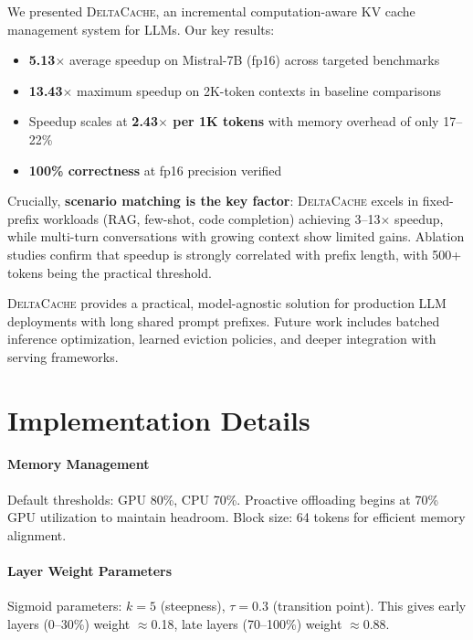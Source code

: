 \documentclass{article}
\newcommand{\deltacache}{\textsc{DeltaCache}}
\begin{document}
We presented \deltacache{}, an incremental computation-aware KV cache management system for LLMs.
Our key results:
\begin{itemize}
    \item \textbf{5.13$\times$} average speedup on Mistral-7B (fp16) across targeted benchmarks
    \item \textbf{13.43$\times$} maximum speedup on 2K-token contexts in baseline comparisons
    \item Speedup scales at \textbf{2.43$\times$ per 1K tokens} with memory overhead of only 17--22\%
    \item \textbf{100\% correctness} at fp16 precision verified
\end{itemize}

Crucially, \textbf{scenario matching is the key factor}: \deltacache{} excels in fixed-prefix workloads (RAG, few-shot, code completion) achieving 3--13$\times$ speedup, while multi-turn conversations with growing context show limited gains.
Ablation studies confirm that speedup is strongly correlated with prefix length, with 500+ tokens being the practical threshold.

\deltacache{} provides a practical, model-agnostic solution for production LLM deployments with long shared prompt prefixes.
Future work includes batched inference optimization, learned eviction policies, and deeper integration with serving frameworks.




\newpage
\appendix

\section{Implementation Details}
\label{app:impl}

\paragraph{Memory Management}
Default thresholds: GPU 80\%, CPU 70\%.
Proactive offloading begins at 70\% GPU utilization to maintain headroom.
Block size: 64 tokens for efficient memory alignment.

\paragraph{Layer Weight Parameters}
Sigmoid parameters: $k=5$ (steepness), $\tau=0.3$ (transition point).
This gives early layers (0--30\%) weight $\approx$0.18, late layers (70--100\%) weight $\approx$0.88.
\end{document}

